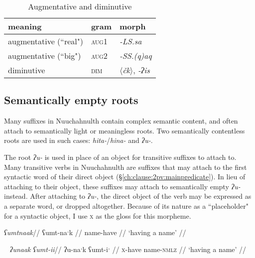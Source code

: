 \begin{table}[ht]
\centering
\caption{Augmentative and diminutive}
\label{table:augdim}
\begin{tabular}{lll}
meaning                            & gram               & morph                                         \\ \hline
\multicolumn{1}{|l|}{augmentative (``real")} & \multicolumn{1}{l|}{\textsc{aug1}}   & \multicolumn{1}{l|}{\textit{-LS.sa}}                   \\ \hline
\multicolumn{1}{|l|}{augmentative (``big")} & \multicolumn{1}{l|}{\textsc{aug2}}   & \multicolumn{1}{l|}{\textit{-SS.(q)aq}}                   \\ \hline
\multicolumn{1}{|l|}{diminutive}   & \multicolumn{1}{l|}{\textsc{dim}} & \multicolumn{1}{l|}{\textit{$\langle$čk$\rangle$}, \textit{-ʔis}} \\ \hline
\end{tabular}
\end{table}

\subsection{Semantically empty roots} \label{sec:empty}

Many suffixes in Nuuchahnulth contain complex semantic content, and often attach to semantically light or meaningless roots. Two semantically contentless roots are used in such cases: \textit{hita-}/\textit{hina-} and \textit{ʔu-}.

The root \textit{ʔu-} is used in place of an object for transitive suffixes to attach to. Many transitive verbs in Nuuchahnulth are suffixes that may attach to the first syntactic word of their direct object (\S\ref{ch:clause:2pv:mainpredicate}). In lieu of attaching to their object, these suffixes may attach to semantically empty \textit{ʔu-} instead. After attaching to \textit{ʔu-}, the direct object of the verb may be expressed as a separate word, or dropped altogether. Because of its nature as a ``placeholder" for a syntactic object, I use \textsc{x} as the gloss for this morpheme.

\ex \label{havename1}
\begingl
\glpreamble \textit{ʕumtnaak}//
\gla ʕumt-naˑk //
\glb name-have //
\glft `having a name' //
\endgl
\xe

\ex~ \label{havename2}
\begingl
\glpreamble \textit{ʔunaak ʕumt-ii}//
\gla ʔu-naˑk ʕumt-iˑ //
\glb \textsc{x}-have name-\textsc{nmlz} //
\glft `having a name' //
\endgl
\xe

